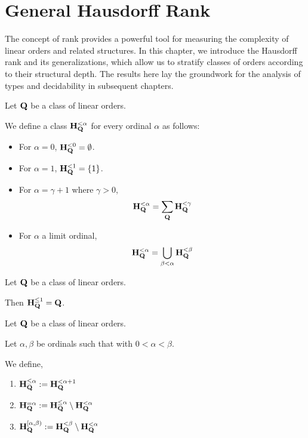 \section{General Hausdorff Rank}

The concept of rank provides a powerful tool for measuring the complexity of linear orders and related structures. In this chapter, we introduce the Hausdorff rank and its generalizations, which allow us to stratify classes of orders according to their structural depth. The results here lay the groundwork for the analysis of types and decidability in subsequent chapters.

\begin{definition}
  Let $\mathbf{Q}$ be a class of linear orders.

  We define a class $\mathbf{H}_{\mathbf{Q}}^{< \alpha}$
  for every ordinal $\alpha$ as follows:

  \begin{itemize}
    \item For $\alpha = 0$, $\mathbf{H}_{\mathbf{Q}}^{< 0} = \emptyset$.
    \item For $\alpha = 1$, $\mathbf{H}_{\mathbf{Q}}^{< 1} = \left\{ {1} \right\}$.
    \item For $\alpha = \gamma + 1$ where $\gamma > 0$,
          \[\mathbf{H}_{\mathbf{Q}}^{< \alpha} = \sum_{\mathbf{Q}}{\mathbf{H}_{\mathbf{Q}}^{< \gamma}}\]
    \item For $\alpha$ a limit ordinal,
          \[\mathbf{H}_{\mathbf{Q}}^{< \alpha} = \bigcup_{\beta < \alpha} \mathbf{H}_{\mathbf{Q}}^{< \beta}\]
  \end{itemize}

\end{definition}

\begin{example}
  Let $\mathbf{Q}$ be a class of linear orders.

  Then $\mathbf{H}_{\mathbf{Q}}^{\le 1} = \mathbf{Q}$.
\end{example}

\begin{definition}
  Let $\mathbf{Q}$ be a class of linear orders.

  Let $\alpha, \beta$ be ordinals such that with $0 < \alpha < \beta$.

  We define,
  \begin{enumerate}
    \item $\mathbf{H}_{\mathbf{Q}}^{\le \alpha} := \mathbf{H}_{\mathbf{Q}}^{< \alpha + 1}$
    \item $\mathbf{H}_{\mathbf{Q}}^{= \alpha} := \mathbf{H}_{\mathbf{Q}}^{\le \alpha} \setminus \mathbf{H}_{\mathbf{Q}}^{< \alpha}$
    \item $\mathbf{H}_{\mathbf{Q}}^{[\alpha, \beta)} := \mathbf{H}_{\mathbf{Q}}^{< \beta} \setminus \mathbf{H}_{\mathbf{Q}}^{< \alpha}$
  \end{enumerate}
\end{definition}

